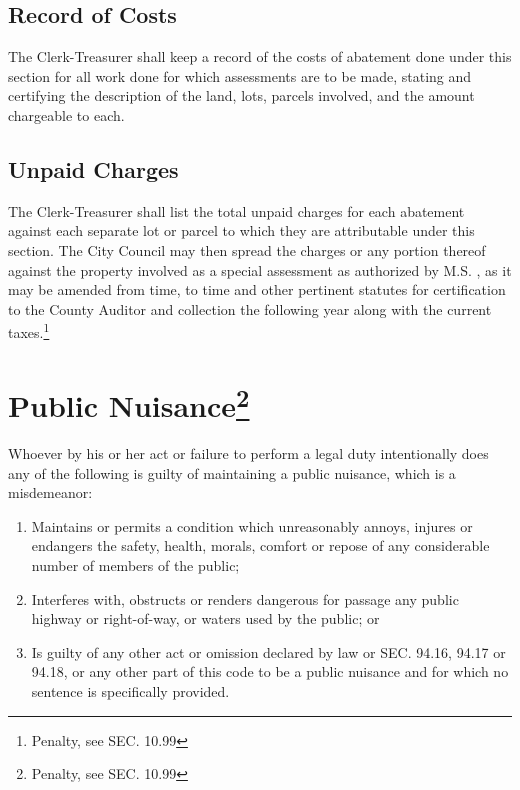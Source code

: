 \subsection{Record of Costs}
The Clerk-Treasurer shall keep a record of the costs of abatement done under this section for all work done for which assessments are to be made, stating and certifying the description of the land, lots, parcels involved, and the amount chargeable to each.
\subsection{Unpaid Charges}
The Clerk-Treasurer shall list the total unpaid charges for each abatement against each separate lot or parcel to which they are attributable under this section. The City Council may then spread the charges or any portion thereof against the property involved as a special assessment as authorized by M.S. , as it may be amended from time, to time and other pertinent statutes for certification to the County Auditor and collection the following year along with the current taxes.\footnote{Penalty, see SEC. 10.99}


\setcounter{section}{14}
\section{Public Nuisance\footnote{Penalty, see SEC. 10.99}}
Whoever by his or her act or failure to perform a legal duty intentionally does any of the following is guilty of maintaining a public nuisance, which is a misdemeanor:
\begin{enumerate}[{\indent}A)]
    \item Maintains or permits a condition which unreasonably annoys, injures or endangers the safety, health, morals, comfort or repose of any considerable number of members of the public;
    \item Interferes with, obstructs or renders dangerous for passage any public highway or right-of-way, or waters used by the public; or
    \item Is guilty of any other act or omission declared by law or SEC. 94.16, 94.17 or 94.18, or any other part of this code to be a public nuisance and for which no sentence is specifically provided.
\end{enumerate}

